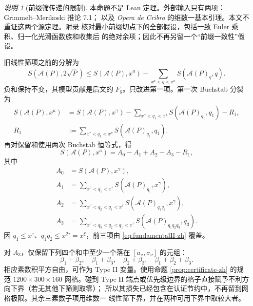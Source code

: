 \documentclass[UTF8,10pt,a4paper]{ctexart}
\newcommand{\Acal}{\mathcal{A}}
\newcommand{\1}{\mathbf{1}}
\theoremstyle{remark}
\newtheorem{remark}[theorem]{说明}
\begin{document}
\begin{remark}[前缀筛传递的限制]
本命题不是 Lean 定理。外部输入只有两项：Grimmelt--Merikoski 推论 7.1；
以及 \emph{Opera de Cribro} 的维数一基本引理。本文不重证这两个源定理。附录
核对最小前缀切点下的全部假设，包括一致 Euler 乘积、归一化光滑函数族和收集后
的绝对余项；因此不再另留一个“前缀一致性”假设。
\end{remark}

旧线性筛项之前的分解为
\begin{equation}\label{eq:retain-F6-zh}
 S(\Acal(P),2\sqrt P)
 \le S(\Acal(P),x^a)
 -\sum_{x^a<q<x^\sigma}S(\Acal(P)_q,q).
\end{equation}
负和保持不变，其模型贡献是后文的 $F_6$。只改进第一项。第一次 Buchstab
分裂为
\begin{equation}\label{eq:first-switch-zh}
\begin{aligned}
 S(\Acal(P),x^a)
 &=S(\Acal(P),x^\gamma)
 -\sum_{x^\gamma<q_1<x^\tau}S(\Acal(P)_{q_1},q_1)-R_1,\\
 R_1&:=\sum_{x^\tau<q_1<x^a}S(\Acal(P)_{q_1},q_1).
\end{aligned}
\end{equation}
再对保留和使用两次 Buchstab 恒等式，得
\begin{equation}\label{eq:four-terms-zh}
 S(\Acal(P),x^a)=A_0-A_1+A_2-A_3-R_1,
\end{equation}
其中
\begin{align*}
 A_0&=S(\Acal(P),x^\gamma),\\
 A_1&=\sum_{x^\gamma<q_1<x^\tau}
 S(\Acal(P)_{q_1},x^\gamma),\\
 A_2&=\sum_{x^\gamma<q_2<q_1<x^\tau}
 S(\Acal(P)_{q_1q_2},x^\gamma),\\
 A_3&=\sum_{x^\gamma<q_3<q_2<q_1<x^\tau}
 S(\Acal(P)_{q_1q_2q_3},q_3).
\end{align*}
因 $q_1\le x^\tau$、$q_1q_2\le x^{2\tau}=x^\xi$，前三项由
\eqref{eq:fundamentalII-zh} 覆盖。

对 $A_3$，仅保留下列四个和中至少一个落在
$[a_\nu,\sigma_\nu]$ 的元组：
\begin{equation}\label{eq:subset-sums-zh}
 \beta_1+\beta_2,\quad \beta_1+\beta_3,\quad
 \beta_2+\beta_3,\quad \beta_1+\beta_2+\beta_3.
\end{equation}
相应素数积平方自由，可作为 Type II 变量。使用命题
\ref{prop:certificate-zh} 的规范 $1200\times300\times160$ 网格。碰到
Type II 端点或优先级边界的格子直接赋予不利方向下界（若无其他下筛则取零）；
所以其损失已经包含在认证节约中，不再留到网格极限。其余三素数子项用维数一
线性筛下界，并在两种可用下界中取较大者。
\end{document}
